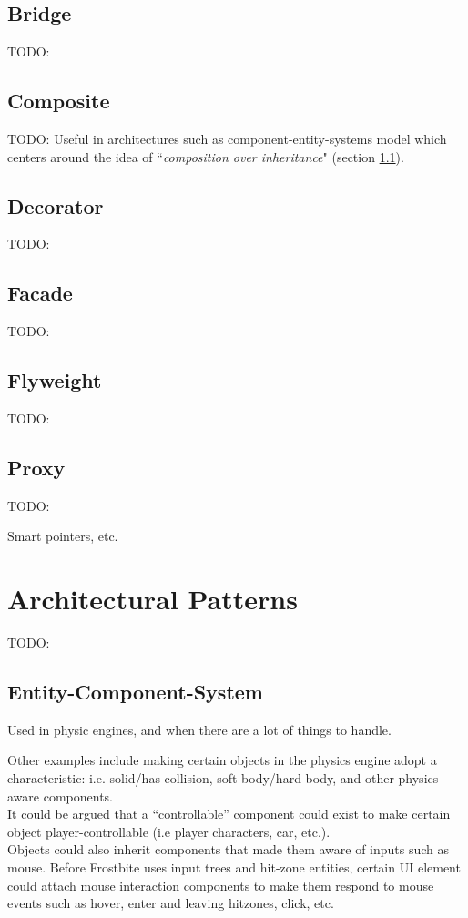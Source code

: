 \documentclass[10pt,letterpaper]{article}
\newcommand{\bs}{\bigskip}
\begin{document}
\begin{multicols}{2}
\subsection{Bridge}
TODO:

\subsection{Composite}
TODO:
Useful in architectures such as component-entity-systems model which centers around the idea of ``\textit{composition over inheritance}" (section \ref{ssection:ecs}).


\subsection{Decorator}
TODO:

\subsection{Facade}
TODO:

\subsection{Flyweight}
TODO:

\subsection{Proxy}
TODO:

Smart pointers, etc.

\section{Architectural Patterns}

TODO:

\subsection{Entity-Component-System}\label{ssection:ecs}

Used in physic engines, and when there are a lot of things to handle.


Other examples include making certain objects in the physics engine adopt a characteristic: i.e. solid/has collision, soft body/hard body, and other physics-aware components.\bs
\\
It could be argued that a ``controllable'' component could exist to make certain object player-controllable (i.e player characters, car, etc.).\bs
\\
Objects could also inherit components that made them aware of inputs such as mouse. Before Frostbite uses input trees and hit-zone entities, certain UI element could attach mouse interaction components to make them respond to mouse events such as hover, enter and leaving hitzones, click, etc.\bs
\\


\end{multicols}
\end{document}
